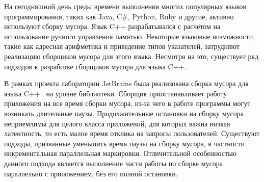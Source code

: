 На сегодняшний день среды времени выполнения многих популярных языков программирования, 
таких как Java, C\#, Python, Ruby и другие, активно используют сборку мусора. 
Язык C++ разрабатывался с расчётом на использование ручного управления памятью. 
Некоторые языковые возможности, такие как адресная арифметика и приведение типов указателей, 
затрудняют реализацию сборщиков мусора для этого языка. 
Несмотря на это, существует ряд подходов к разработке сборщиков мусора для языка C++. 

В рамках проекта лаборатории JetBrains была реализована сборка мусора для языка 
C++~\cite{book:precisegc_berezun,book:precisegc_samofalov,book:precisegc_secr} на уровне 
библиотеки. 
Сборщик приостанавливает работу приложения на все время сборки мусора, из-за чего в работе 
программы могут возникать длительные паузы. 
Продолжительные остановки на сборку мусора неприемлимы для целого класса приложений, 
для которых важна низкая латентность, то есть малое время отклика на запросы пользователей. 
Существуют подходы, призванные уменьшить время паузы на сборку мусора, в частности 
инкрементальная параллельная маркировки. 
Отличительной особенностью данного подхода является выполнение части работы по сборке мусора 
параллельно с приложением, без его полной остановки.
